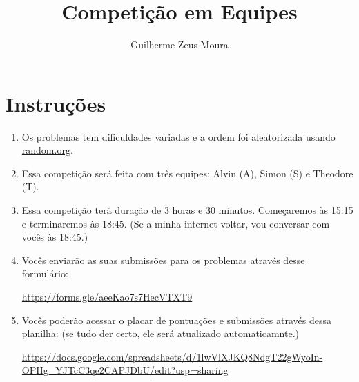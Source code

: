 \documentclass[10pt,a4paper]{article}
\title{Competição em Equipes}
\author{Guilherme Zeus Moura}
\begin{document}
	
	\zeustitle

	\section{Instruções}

	\begin{enumerate}[label* = \textbf{\Roman*.}]
		\item Os problemas tem dificuldades variadas e a ordem foi aleatorizada usando \url{random.org}.
		\item Essa competição será feita com três equipes: Alvin (A), Simon (S) e Theodore (T).
		\item Essa competição terá duração de $3$ horas e $30$ minutos. Começaremos às 15:15 e terminaremos às 18:45. (Se a minha internet voltar, vou conversar com vocês às 18:45.)
		\item Vocês enviarão as suas submissões para os problemas através desse formulário:
			
			\begin{center}
				\url{https://forms.gle/aeeKao7s7HecVTXT9}
			\end{center}

		\item Vocês poderão acessar o placar de pontuações e submissões através dessa planilha: (se tudo der certo, ele será atualizado automaticamnte.)

			\begin{center}
				\footnotesize\url{https://docs.google.com/spreadsheets/d/1lwVlXJKQ8NdgT22gWyoIn-OPHg_YJTcC3qe2CAPJDbU/edit?usp=sharing}
			\end{center}


\end{enumerate}
\end{document}
